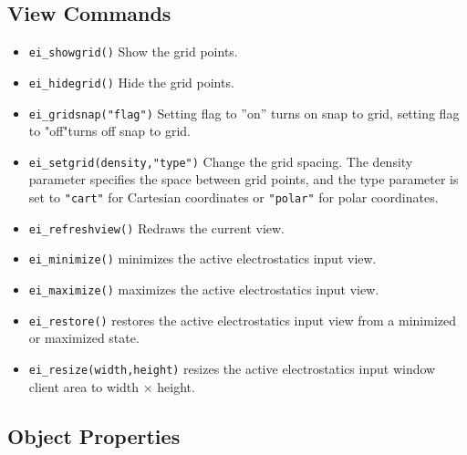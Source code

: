 \subsection{View Commands}
\begin{itemize}
\item \texttt{ei\_showgrid()} Show the grid points.

\item \texttt{ei\_hidegrid()} Hide the grid points.

\item \texttt{ei\_gridsnap("flag")} Setting flag to ''on'' turns on snap to grid,
setting flag to "off"turns off snap to grid.

\item \texttt{ei\_setgrid(density,"type")} Change the grid spacing. The density
parameter specifies the space between grid points, and the type
parameter is set to \texttt{"cart"} for Cartesian coordinates or
\texttt{"polar"} for polar coordinates.

\item \texttt{ei\_refreshview()} Redraws the current view.

\item{\tt ei\_minimize()} minimizes the active electrostatics input view.

\item{\tt ei\_maximize()} maximizes the active electrostatics input view.

\item{\tt ei\_restore()} restores the active electrostatics input view from a
 minimized or maximized state.

\item{\tt ei\_resize(width,height)} resizes the active electrostatics input
 window client area to width $\times$ height.

\end{itemize}




\subsection{Object Properties}

